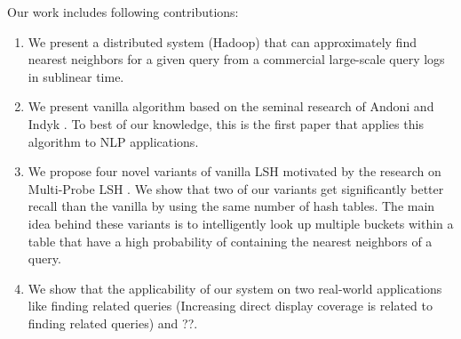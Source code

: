 Our work includes following contributions: 
\begin{enumerate}
\item We present a distributed system (Hadoop) that can approximately find nearest neighbors for a given query from a commercial large-scale query logs in sublinear time. %
\item We present vanilla \lsh algorithm based on the seminal research of Andoni and Indyk  . To best of our knowledge, this is the first paper that applies this algorithm to NLP applications. 
\item We propose four novel variants of vanilla LSH motivated by the research on Multi-Probe LSH \cite{LvVLDB07}.  We show that two of our variants get significantly better recall than the vanilla \lsh by using the same number of hash tables. The main idea behind these variants is to intelligently look up multiple buckets within a table that have a high probability of containing the nearest neighbors of a query.  
\item  We show that the applicability of our system on two real-world applications like finding related queries (Increasing  direct display coverage is related to finding related queries) and ??.
\end{enumerate}


